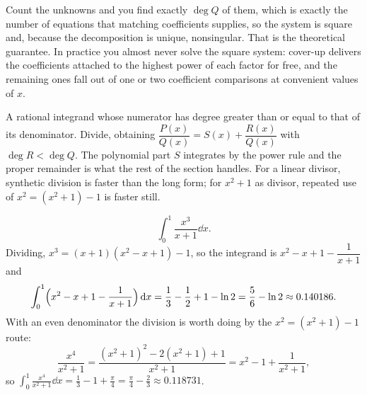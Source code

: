 Count the unknowns and you find exactly $\deg Q$ of them, which is exactly the number of equations that matching coefficients supplies, so the system is square and, because the decomposition is unique, nonsingular. That is the theoretical guarantee. In practice you almost never solve the square system: cover-up delivers the coefficients attached to the highest power of each factor for free, and the remaining ones fall out of one or two coefficient comparisons at convenient values of $x$.

\begin{center}
\end{center}

\cue A rational integrand whose numerator has degree greater than or equal to that of its denominator.
\method Divide, obtaining $\dfrac{P(x)}{Q(x)}=S(x)+\dfrac{R(x)}{Q(x)}$ with $\deg R<\deg Q$. The polynomial part $S$ integrates by the power rule and the proper remainder is what the rest of the section handles. For a linear divisor, synthetic division is faster than the long form; for $x^2+1$ as divisor, repeated use of $x^2=(x^2+1)-1$ is faster still.

\begin{worked}
\[
\int_0^1\frac{x^3}{x+1}\dd x .
\]
Dividing, $x^3=(x+1)(x^2-x+1)-1$, so the integrand is $x^2-x+1-\dfrac{1}{x+1}$ and
\[
\int_0^1\Bigl(x^2-x+1-\frac{1}{x+1}\Bigr)\,\mathrm{d} x=\frac13-\frac12+1-\ln2=\frac56-\ln2\approx0.140186 .
\]
With an even denominator the division is worth doing by the $x^2=(x^2+1)-1$ route:
\[
\frac{x^4}{x^2+1}=\frac{(x^2+1)^2-2(x^2+1)+1}{x^2+1}=x^2-1+\frac{1}{x^2+1},
\]
so $\displaystyle\int_0^1\frac{x^4}{x^2+1}\dd x=\frac13-1+\frac{\pi}{4}=\frac{\pi}{4}-\frac23\approx0.118731$.
\end{worked}

